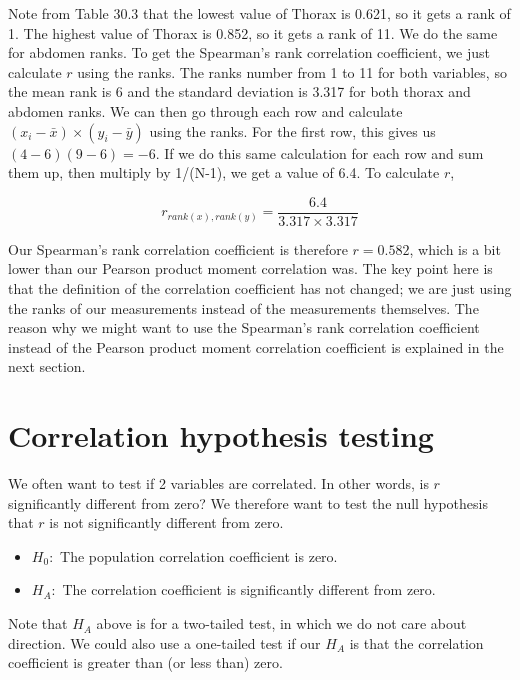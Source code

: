 \documentclass[
  openany]{krantz}
\providecommand{\tightlist}{%
  \setlength{\itemsep}{0pt}\setlength{\parskip}{0pt}}
\begin{document}
Note from Table 30.3 that the lowest value of Thorax is 0.621, so it gets a rank of 1.
The highest value of Thorax is 0.852, so it gets a rank of 11.
We do the same for abdomen ranks.
To get the Spearman's rank correlation coefficient, we just calculate \(r\) using the ranks.
The ranks number from 1 to 11 for both variables, so the mean rank is 6 and the standard deviation is 3.317 for both thorax and abdomen ranks.
We can then go through each row and calculate \(\left(x_{i} - \bar{x} \right) \times \left(y_{i} - \bar{y} \right)\) using the ranks.
For the first row, this gives us \(\left(4 - 6 \right) \left(9 - 6 \right) = -6\).
If we do this same calculation for each row and sum them up, then multiply by 1/(N-1), we get a value of 6.4.
To calculate \(r\),

\[r_{rank(x),rank(y)} = \frac{6.4}{3.317 \times 3.317}\]

Our Spearman's rank correlation coefficient is therefore \(r = 0.582\), which is a bit lower than our Pearson product moment correlation was.
The key point here is that the definition of the correlation coefficient has not changed; we are just using the ranks of our measurements instead of the measurements themselves.
The reason why we might want to use the Spearman's rank correlation coefficient instead of the Pearson product moment correlation coefficient is explained in the next section.

\hypertarget{correlation-hypothesis-testing}{%
\section{Correlation hypothesis testing}\label{correlation-hypothesis-testing}}

We often want to test if 2 variables are correlated.
In other words, is \(r\) significantly different from zero?
We therefore want to test the null hypothesis that \(r\) is not significantly different from zero.

\begin{itemize}
\tightlist
\item
  \(H_{0}:\) The population correlation coefficient is zero.
\item
  \(H_{A}:\) The correlation coefficient is significantly different from zero.
\end{itemize}

Note that \(H_{A}\) above is for a two-tailed test, in which we do not care about direction.
We could also use a one-tailed test if our \(H_{A}\) is that the correlation coefficient is greater than (or less than) zero.
\end{document}
